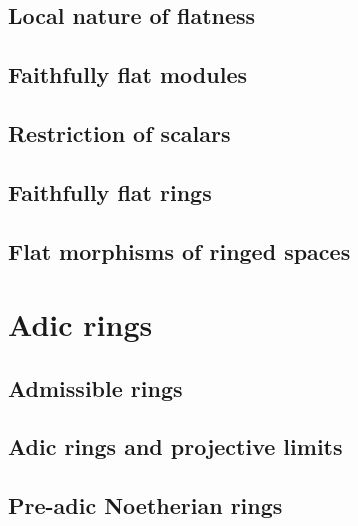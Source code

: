         \subsection{Local nature of flatness}
        

        \subsection{Faithfully flat modules}
        

        \subsection{Restriction of scalars}
        

        \subsection{Faithfully flat rings}
        

        \subsection{Flat morphisms of ringed spaces}
        

    \section{Adic rings}

        \subsection{Admissible rings}
        

        \subsection{Adic rings and projective limits}
        

        \subsection{Pre-adic Noetherian rings}
        

